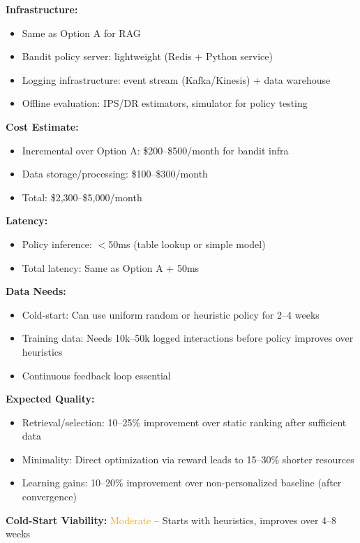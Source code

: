 \documentclass[11pt,letterpaper]{article}
\begin{document}
\textbf{Infrastructure:}
\begin{itemize}
\item Same as Option A for RAG
\item Bandit policy server: lightweight (Redis + Python service)
\item Logging infrastructure: event stream (Kafka/Kinesis) + data warehouse
\item Offline evaluation: IPS/DR estimators, simulator for policy testing
\end{itemize}

\textbf{Cost Estimate:}
\begin{itemize}
\item Incremental over Option A: \$200--\$500/month for bandit infra
\item Data storage/processing: \$100--\$300/month
\item Total: \$2,300--\$5,000/month
\end{itemize}

\textbf{Latency:}
\begin{itemize}
\item Policy inference: $<$50ms (table lookup or simple model)
\item Total latency: Same as Option A + 50ms
\end{itemize}

\textbf{Data Needs:}
\begin{itemize}
\item Cold-start: Can use uniform random or heuristic policy for 2--4 weeks
\item Training data: Needs 10k--50k logged interactions before policy improves over heuristics
\item Continuous feedback loop essential
\end{itemize}

\textbf{Expected Quality:}
\begin{itemize}
\item Retrieval/selection: 10--25\% improvement over static ranking after sufficient data
\item Minimality: Direct optimization via reward leads to 15--30\% shorter resources
\item Learning gains: 10--20\% improvement over non-personalized baseline (after convergence)
\end{itemize}

\textbf{Cold-Start Viability:} \textcolor{orange}{Moderate} -- Starts with heuristics, improves over 4--8 weeks
\end{document}
